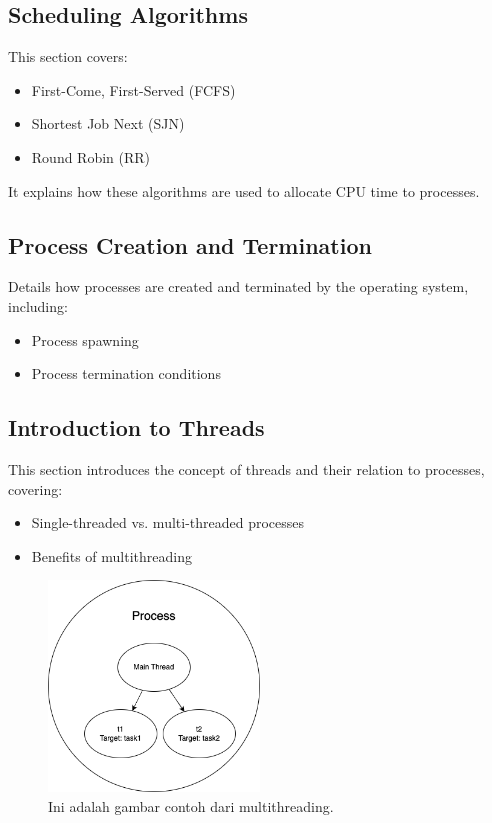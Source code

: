 \documentclass[12pt]{article}
\begin{document}
\subsection{Scheduling Algorithms}
This section covers:
\begin{itemize}
    \item First-Come, First-Served (FCFS)
    \item Shortest Job Next (SJN)
    \item Round Robin (RR)
\end{itemize}
It explains how these algorithms are used to allocate CPU time to processes.

\subsection{Process Creation and Termination}
Details how processes are created and terminated by the operating system, including:
\begin{itemize}
    \item Process spawning
    \item Process termination conditions
\end{itemize}

\subsection{Introduction to Threads}
This section introduces the concept of threads and their relation to processes, covering:
\begin{itemize}
    \item Single-threaded vs. multi-threaded processes
    \item Benefits of multithreading
\end{itemize}

\begin{figure}[h]
    \centering
    \includegraphics[width=0.5\textwidth]{asset/example.png}  %
    \caption{Ini adalah gambar contoh dari multithreading.}
    \label{fig:contoh_gambar}
\end{figure}
\end{document}
